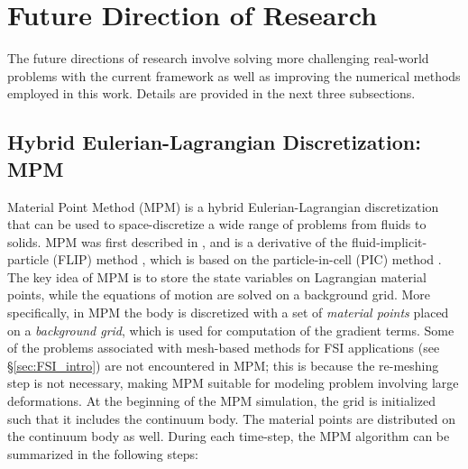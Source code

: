 \section{Future Direction of Research}
The future directions of research involve solving more challenging real-world problems with the current framework as well as improving the numerical methods employed in this work. Details are provided in the next three subsections.
\subsection{Hybrid Eulerian-Lagrangian Discretization: MPM}
Material Point Method (MPM) is a hybrid Eulerian-Lagrangian discretization that can be used to space-discretize a wide range of problems from fluids to solids.  MPM was first described in \cite{sulsky1994particle}, and is a derivative of the fluid-implicit-particle (FLIP) method \cite{brackbill1988flip}, which is based on the particle-in-cell (PIC) method \cite{harlow1964particle}. The key idea of MPM is to store the state variables on Lagrangian material points, while the equations of motion are solved on a background grid.  More specifically, in MPM the body is discretized with a set of \textit{material points} placed on a \textit{background grid}, which is used for computation of the gradient terms. Some of the problems associated with mesh-based methods for FSI applications (see \S\ref{sec:FSI_intro})  are not encountered in MPM; this is because the re-meshing step is not necessary, making  MPM suitable for modeling problem involving large deformations. At the beginning of the MPM  simulation, the grid is initialized such that it includes the continuum body. The material points are distributed on the continuum body as well. During each time-step, the MPM algorithm can be summarized in the following steps:
